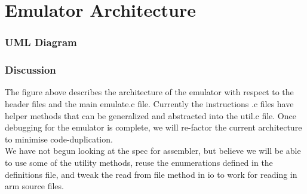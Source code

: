 \documentclass[11pt]{article}
\begin{document}
\section{Emulator Architecture}
\subsubsection{UML Diagram}
\subsubsection{Discussion}
The figure above describes the architecture of the emulator with respect to the header files and the main emulate.c file. Currently the instructions .c files have helper methods that can be generalized and abstracted into the util.c file. Once debugging for the emulator is complete, we will re-factor the current architecture to minimise code-duplication. \\
We have not begun looking at the spec for assembler, but believe we will be able to use some of the utility methods, reuse the enumerations defined in the definitions file, and tweak the read from file method in io to work for reading in arm source files. 
\end{document}
